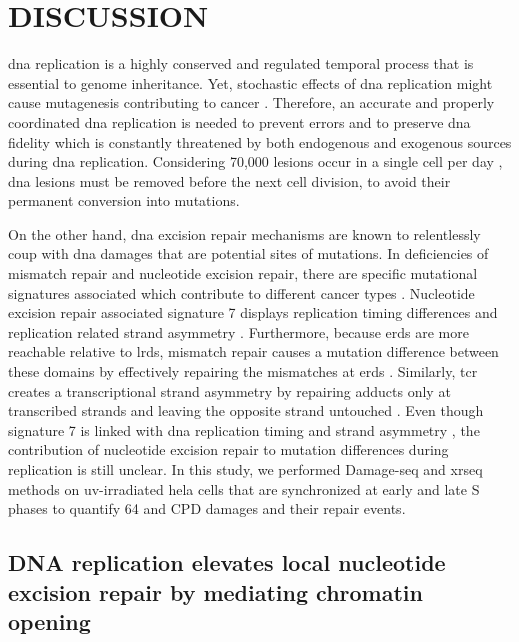 \setlength{\parindent}{0pt}
\chapter{\bf DISCUSSION}

\gls{dna} replication is a highly conserved and regulated temporal process that is essential to genome inheritance. Yet, stochastic effects of \gls{dna} replication might cause mutagenesis contributing to cancer \citep{tomasetti2015variation}. Therefore, an accurate and properly coordinated \gls{dna} replication is needed to prevent errors and to preserve \gls{dna} fidelity which is constantly threatened by both endogenous and exogenous sources during \gls{dna} replication. Considering 70,000 lesions occur in a single cell per day \citep{lindahl2000repair}, \gls{dna} lesions must be removed before the next cell division, to avoid their permanent conversion into mutations. 

On the other hand, \gls{dna} excision repair mechanisms are known to relentlessly coup with \gls{dna} damages that are potential sites of mutations. In deficiencies of mismatch repair and nucleotide excision repair, there are specific mutational signatures associated which contribute to different cancer types \citep{helleday2014mechanisms}. Nucleotide excision repair associated signature 7 displays replication timing differences and replication related strand asymmetry \citep{tomkova2018mutational}. Furthermore, because \gls{erd}s are more reachable relative to \gls{lrd}s, mismatch repair causes a mutation difference between these domains by effectively repairing the mismatches at \gls{erd}s \citep{supek2015differential}. Similarly, \gls{tcr} creates a transcriptional strand asymmetry by repairing adducts only at transcribed strands and leaving the opposite strand untouched \citep{zheng2014transcription}. Even though signature 7 is linked with \gls{dna} replication timing and strand asymmetry \citep{tomkova2018mutational}, the contribution of nucleotide excision repair to mutation differences during replication is still unclear. In this study, we performed Damage-seq and \gls{xrseq} methods on \gls{uv}-irradiated \gls{hela} cells that are synchronized at early and late S phases to quantify \gls{64} and \gls{CPD} damages and their repair events. 

\section{DNA replication elevates local nucleotide excision repair by mediating chromatin opening}

